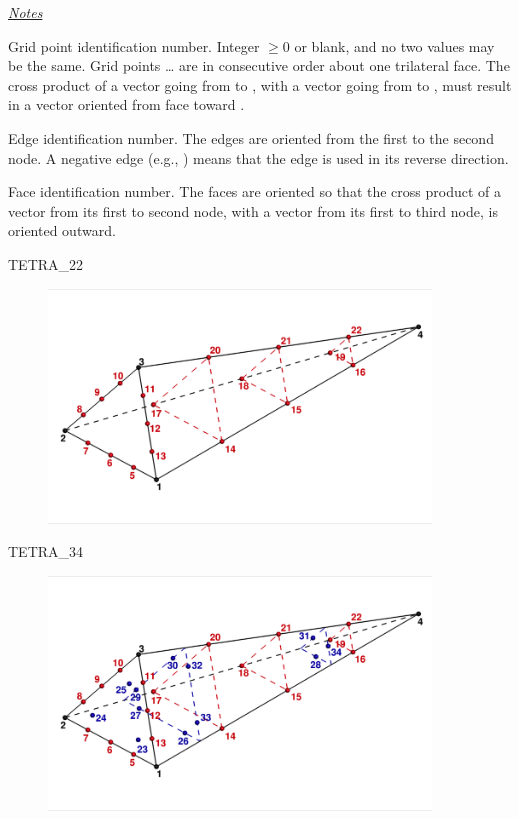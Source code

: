 {{{\newpage
\uline{\textit{Notes}}%
\begin{Ventryi}{}
   \item [\fort{N1,\ldots,N20}]
         Grid point identification number.
         Integer $\ge 0$ or blank, and no two values may be the same.
         Grid points \ldots{} are in consecutive order about
         one trilateral face.
         The cross product of a vector going from  to ,
         with a vector going from  to , must result in a
         vector oriented from face  toward .
   \item [\fort{E1,\ldots,E6}]
         Edge identification number.
         The edges are oriented from the first to the second node.
         A negative edge (e.g., ) means that the edge is used in
         its reverse direction.
   \item [\fort{F1,\ldots,F4}]
         Face identification number.
         The faces are oriented so that the cross product of a vector
         from its first to second node, with a vector from its first to
         third node, is oriented outward.
\end{Ventryi}

\newpage
{}

TETRA\_22
\begin{figure}[!htb]
   \includegraphics[width=4in]{conv.figs/TecplotFiles_Quartic_Element/All_Figures/Tetra_22}
\end{figure}

\bigskip

TETRA\_34
\begin{figure}[!htb]
   \includegraphics[width=4in]{conv.figs/TecplotFiles_Quartic_Element/All_Figures/Tetra_34}
\end{figure}

}}}
